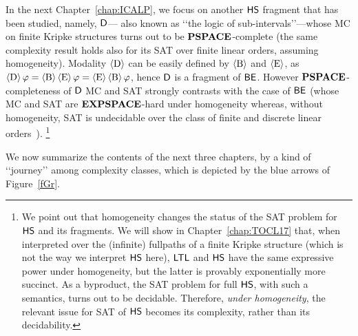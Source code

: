 In the next Chapter~\ref{chap:ICALP}, we focus on another $\text{\sffamily HS}$ fragment that has been studied, namely, $\mathsf{D}$---%
also known as \lq\lq the logic of sub-intervals\rq\rq---whose MC on finite Kripke structures turns out to be $\textbf{PSPACE}$-complete (the same complexity result holds also for its SAT over finite linear orders, assuming homogeneity). 
Modality $\operatorname{\langle D\rangle}$ can be easily defined by $\operatorname{\langle B\rangle}$ and $\operatorname{\langle E\rangle}$, as
$\operatorname{\langle D\rangle} \varphi = \operatorname{\langle B\rangle} \operatorname{\langle E\rangle} \varphi = \operatorname{\langle E\rangle} \operatorname{\langle B\rangle} \varphi$,
hence $\mathsf{D}$ is a fragment of $\mathsf{BE}$. However
$\textbf{PSPACE}$-completeness of $\mathsf{D}$ MC and SAT strongly contrasts with the case of $\mathsf{BE}$ (whose MC and SAT are $\textbf{EXPSPACE}$-hard under homogeneity whereas, without homogeneity, SAT is undecidable over the class of finite and discrete linear orders~\cite{DBLP:journals/fuin/MarcinkowskiM14}).%
%
\footnote{We point out that homogeneity changes the status of the SAT problem for $\text{\sffamily HS}$ and its fragments. We will show in Chapter~\ref{chap:TOCL17} that, when interpreted over the (infinite) fullpaths of a finite Kripke structure (which is not the way we interpret $\text{\sffamily HS}$ here), $\text{\sffamily LTL}$ and $\text{\sffamily HS}$ have the same expressive power under homogeneity, but the latter is provably exponentially more succinct. As a byproduct, the SAT problem for full $\text{\sffamily HS}$, with such a semantics, turns out to be decidable. Therefore, \emph{under homogeneity}, the relevant issue for SAT of $\text{\sffamily HS}$ becomes its complexity, rather than its decidability.}

We now summarize the contents of the next three chapters, by a kind of \lq\lq journey\rq\rq{} among complexity classes, which is depicted by the blue arrows of Figure~\ref{fGr}.

